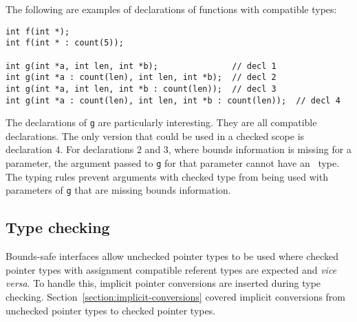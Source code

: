 The following are examples of declarations of functions with compatible types:
\begin{verbatim}
int f(int *);
int f(int * : count(5));

int g(int *a, int len, int *b);               // decl 1
int g(int *a : count(len), int len, int *b);  // decl 2
int g(int *a, int len, int *b : count(len));  // decl 3
int g(int *a : count(len), int len, int *b : count(len));  // decl 4
\end{verbatim}
The declarations of \texttt{g} are particularly interesting. They are all
compatible declarations.  The only version
that could be used in a checked scope is declaration 4.   For declarations 2 and 3,
where bounds information is missing for a parameter, the argument passed to \texttt{g}
for that parameter cannot have an \arrayptr\ type.  The typing rules prevent arguments
with checked type from being used with parameters of \texttt{g} that are missing
bounds information.

\subsection{Type checking}
\label{section:bounds-safe-interface-type-checking}

Bounds-safe interfaces allow unchecked pointer types to be used
where checked pointer types with assignment compatible referent types are
expected and {\it vice versa}.
To handle this, implicit pointer conversions are inserted during type checking.
Section~\ref{section:implicit-conversions} covered implicit conversions from unchecked pointer types to checked pointer types.

